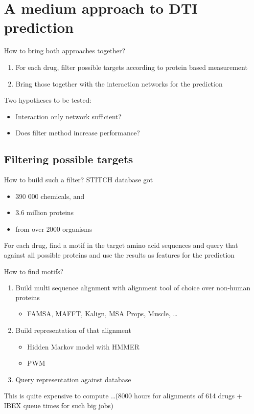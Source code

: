 \documentclass[10pt]{beamer}
\begin{document}
\section{A medium approach to DTI prediction}
\begin{frame}{How to bring both approaches together?}
	\begin{enumerate}
		\item For each drug, filter possible targets according to protein based measurement
		\item Bring those together with the interaction networks for the prediction
	\end{enumerate}
	\pause
	Two hypotheses to be tested:
	\begin{itemize}
		\item Interaction only network sufficient?
		\item Does filter method increase performance?
	\end{itemize}
\end{frame}

\subsection{Filtering possible targets}
\begin{frame}{How to build such a filter?}
	STITCH database got 
	\begin{itemize}
		\item 390 000 chemicals, and
		\item 3.6 million proteins
		\item from over 2000 organisms
	\end{itemize}
	\pause 
	\vspace{0.5cm}
	For each drug, find a motif in the target amino acid sequences and query that against all possible proteins and use the results as features for the prediction
\end{frame}

\begin{frame}{How to find motifs?}
	\begin{enumerate}
		\item Build multi sequence alignment with alignment tool of choice over non-human proteins
			\begin{itemize}
				\item FAMSA, MAFFT, Kalign, MSA Props, Muscle, \dots
			\end{itemize}
		\item Build representation of that alignment
			\begin{itemize}
				\item Hidden Markov model with HMMER
				\item PWM
			\end{itemize}
		\item Query representation against database
	\end{enumerate}
	\pause
	\vspace{0.5cm}
	This is quite expensive to compute \dots (8000 hours for alignments of 614 drugs + IBEX queue times for such big jobs)
\end{frame}
\end{document}

